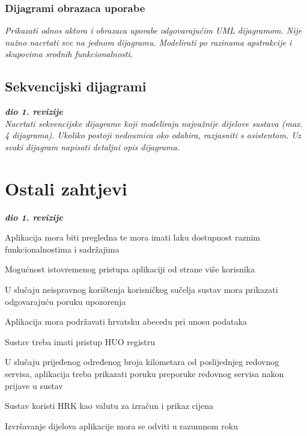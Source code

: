 					
				\subsubsection{Dijagrami obrazaca uporabe}
					
					\textit{Prikazati odnos aktora i obrazaca uporabe odgovarajućim UML dijagramom. Nije nužno nacrtati sve na jednom dijagramu. Modelirati po razinama apstrakcije i skupovima srodnih funkcionalnosti.}
				\eject		
				
			\subsection{Sekvencijski dijagrami}
				
				\textbf{\textit{dio 1. revizije}}\\
				
				\textit{Nacrtati sekvencijske dijagrame koji modeliraju najvažnije dijelove sustava (max. 4 dijagrama). Ukoliko postoji nedoumica oko odabira, razjasniti s asistentom. Uz svaki dijagram napisati detaljni opis dijagrama.}
				\eject
	
		\section{Ostali zahtjevi}
		
			\textbf{\textit{dio 1. revizije}}\\
		 
			 	\begin{packed_item}
			 	
			 	\item  Aplikacija mora biti pregledna te mora imati laku dostupnost raznim funkcionalnostima i sadržajima
			 	\item Mogućnost istovremenog pristupa aplikaciji od strane više korisnika
			 	\item U slučaju neispravnog korištenja korisničkog sučelja sustav mora prikazati odgovarajuću poruku upozorenja
			 	\item  Aplikacija mora podržavati hrvatsku abecedu pri unosu podataka 
			 	\item Sustav treba imati pristup HUO registru
			 	\item  U slučaju prijeđenog određenog broja kilometara od poslijednjeg redovnog servisa, aplikacija treba prikazati poruku preporuke redovnog servisa nakon prijave u sustav
			 	\item Sustav koristi HRK kao valutu za izračun i prikaz cijena
			 	\item Izvršavanje dijelova aplikacije mora se odviti u razumnom roku
			 	
			 \end{packed_item}
			 
			 
			 
	